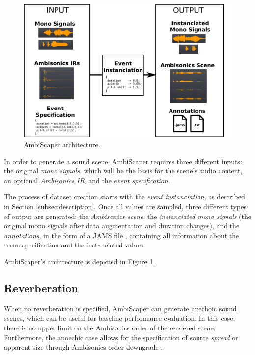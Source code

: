 \begin{figure}
\label{fig_architecture}
  \centering
    \includegraphics[width=\textwidth]{Figures/DataGeneration/figure_architecture_V2.png}
    \caption{AmbiScaper architecture.}
\end{figure}

In order to generate a sound scene, AmbiScaper requires three different inputs: the original \textit{mono signals}, which will be the basis for the scene's audio content, an optional \textit{Ambisonics IR}, and the \textit{event specification}. 

The process of dataset creation starts with the \textit{event instanciation}, as described in Section \ref{subsec:description}. Once all values are sampled, three different types of output are generated: the \textit{Ambisonics scene}, the \textit{instanciated mono signals} (the original mono signals after data augmentation and duration changes), and the \textit{annotations}, in the form of a JAMS file \cite{humphrey2014jams}, containing all information about the scene specification and the instanciated values. 

AmbiScaper's architecture is depicted in Figure \ref{fig_architecture}.


\subsection{Reverberation}

When no reverberation is specified, AmbiScaper can generate anechoic sound scenes, which can be useful for baseline performance evaluation. In this case, there is no upper limit on the Ambisonics order of the rendered scene. Furthermore, the anoechic case allows for the specification of source \textit{spread} or apparent size through Ambisonics order downgrade \cite{carpentier2017ambisonic}.

